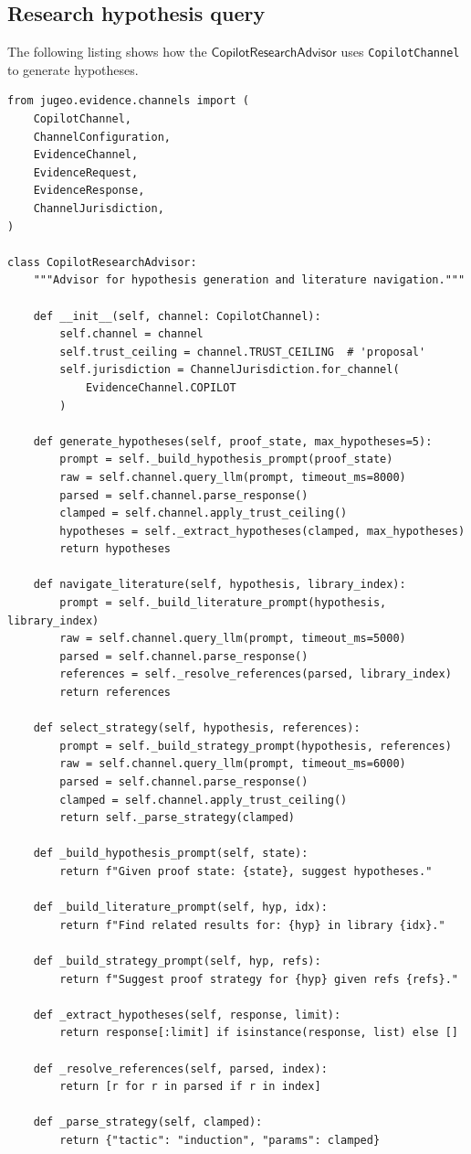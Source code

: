 \documentclass[11pt]{article}
\newcommand{\ResAdv}{\mathsf{CopilotResearchAdvisor}}
\begin{document}
\subsection{Research hypothesis query}

The following listing shows how the $\ResAdv$ uses
\texttt{CopilotChannel} to generate hypotheses.

\begin{lstlisting}[style=jugeo-python,
  caption={Research hypothesis generation via CopilotChannel},
  label={lst:reshyp}]
from jugeo.evidence.channels import (
    CopilotChannel,
    ChannelConfiguration,
    EvidenceChannel,
    EvidenceRequest,
    EvidenceResponse,
    ChannelJurisdiction,
)

class CopilotResearchAdvisor:
    """Advisor for hypothesis generation and literature navigation."""

    def __init__(self, channel: CopilotChannel):
        self.channel = channel
        self.trust_ceiling = channel.TRUST_CEILING  # 'proposal'
        self.jurisdiction = ChannelJurisdiction.for_channel(
            EvidenceChannel.COPILOT
        )

    def generate_hypotheses(self, proof_state, max_hypotheses=5):
        prompt = self._build_hypothesis_prompt(proof_state)
        raw = self.channel.query_llm(prompt, timeout_ms=8000)
        parsed = self.channel.parse_response()
        clamped = self.channel.apply_trust_ceiling()
        hypotheses = self._extract_hypotheses(clamped, max_hypotheses)
        return hypotheses

    def navigate_literature(self, hypothesis, library_index):
        prompt = self._build_literature_prompt(hypothesis, library_index)
        raw = self.channel.query_llm(prompt, timeout_ms=5000)
        parsed = self.channel.parse_response()
        references = self._resolve_references(parsed, library_index)
        return references

    def select_strategy(self, hypothesis, references):
        prompt = self._build_strategy_prompt(hypothesis, references)
        raw = self.channel.query_llm(prompt, timeout_ms=6000)
        parsed = self.channel.parse_response()
        clamped = self.channel.apply_trust_ceiling()
        return self._parse_strategy(clamped)

    def _build_hypothesis_prompt(self, state):
        return f"Given proof state: {state}, suggest hypotheses."

    def _build_literature_prompt(self, hyp, idx):
        return f"Find related results for: {hyp} in library {idx}."

    def _build_strategy_prompt(self, hyp, refs):
        return f"Suggest proof strategy for {hyp} given refs {refs}."

    def _extract_hypotheses(self, response, limit):
        return response[:limit] if isinstance(response, list) else []

    def _resolve_references(self, parsed, index):
        return [r for r in parsed if r in index]

    def _parse_strategy(self, clamped):
        return {"tactic": "induction", "params": clamped}
\end{lstlisting}
\end{document}
